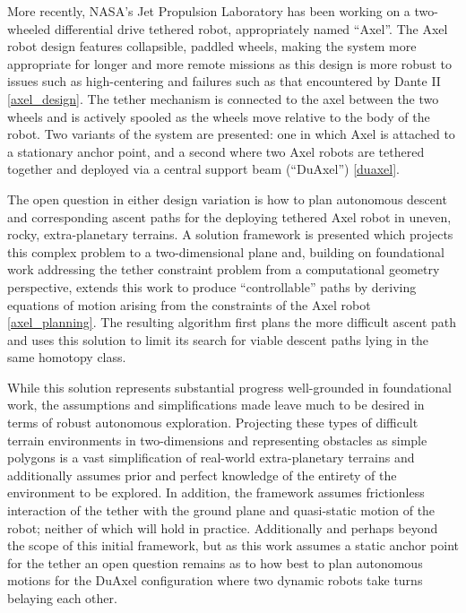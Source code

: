 \documentclass[12pt]{article}
\begin{document}
More recently, NASA's Jet Propulsion Laboratory has been working on a two-wheeled
differential drive tethered robot, appropriately named ``Axel''. The Axel robot 
design features collapsible, paddled wheels, making the system more appropriate for longer 
and more remote missions as this design is more robust to issues such as high-centering and 
failures such as that encountered by Dante II \ref{axel_design}. The tether mechanism is connected to the axel 
between the two wheels and is actively spooled as the wheels move relative to the body of the robot. 
Two variants of the system are presented: one in which Axel is attached to a stationary anchor point, 
and a second where two Axel robots are tethered together and deployed via a central support beam (``DuAxel'') \ref{duaxel}. 

The open question in either design variation is how to plan autonomous descent and corresponding 
ascent paths for the deploying tethered Axel robot in uneven, rocky, extra-planetary terrains. 
A solution framework is presented which projects this complex problem to a two-dimensional plane and, 
building on foundational work addressing the tether constraint problem from a computational geometry 
perspective, extends this work to produce ``controllable'' paths by deriving equations of motion arising from 
the constraints of the Axel robot \ref{axel_planning}. The resulting algorithm first plans the more difficult ascent path and
uses this solution to limit its search for viable descent paths lying in the same homotopy class. 

While this solution represents substantial progress well-grounded in foundational work, the 
assumptions and simplifications made leave much to be desired in terms of robust autonomous
exploration. Projecting these types of difficult terrain environments in two-dimensions and representing
obstacles as simple polygons is a vast simplification of real-world extra-planetary terrains and 
additionally assumes prior and perfect knowledge of the entirety of the environment to be explored. In addition,
the framework assumes frictionless interaction of the tether with the ground plane and quasi-static 
motion of the robot; neither of which will hold in practice. Additionally and perhaps beyond the scope 
of this initial framework, but as this work assumes a static anchor point for the tether an open 
question remains as to how best to plan autonomous motions for the DuAxel configuration where two 
dynamic robots take turns belaying each other.
\end{document}
